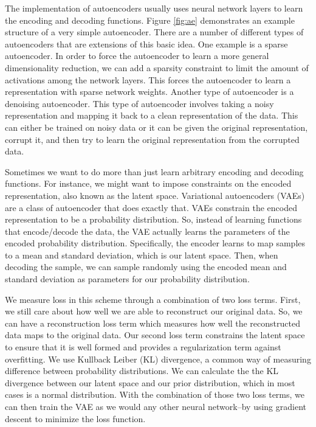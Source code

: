 The implementation of autoencoders usually uses neural network layers to learn the encoding and decoding functions.
Figure \ref{fig:ae} demonstrates an example structure of a very simple autoencoder.
There are a number of different types of autoencoders that are extensions of this basic idea.
One example is a sparse autoencoder.
In order to force the autoencoder to learn a more general dimensionality reduction, we can add a sparsity constraint to limit the amount of activations among the network layers.
This forces the autoencoder to learn a representation with sparse network weights.
Another type of autoencoder is a denoising autoencoder.
This type of autoencoder involves taking a noisy representation and mapping it back to a clean representation of the data.
This can either be trained on noisy data or it can be given the original representation, corrupt it, and then try to learn the original representation from the corrupted data.

Sometimes we want to do more than just learn arbitrary encoding and decoding functions.
For instance, we might want to impose constraints on the encoded representation, also known as the latent space.
Variational autoencoders (VAEs) are a class of autoencoder that does exactly that.
VAEs constrain the encoded representation to be a probability distribution.
So, instead of learning functions that encode/decode the data, the VAE actually learns the parameters of the encoded probability distribution.
Specifically, the encoder learns to map samples to a mean and standard deviation, which is our latent space.
Then, when decoding the sample, we can sample randomly using the encoded mean and standard deviation as parameters for our probability distribution.

We measure loss in this scheme through a combination of two loss terms.
First, we still care about how well we are able to reconstruct our original data.
So, we can have a reconstruction loss term which measures how well the reconstructed data maps to the original data.
Our second loss term constrains the latent space to ensure that it is well formed and provides a regularization term against overfitting.
We use Kullback Leiber (KL) divergence, a common way of measuring difference between probability distributions.
We can calculate the the KL divergence between our latent space and our prior distribution, which in most cases is a normal distribution.
With the combination of those two loss terms, we can then train the VAE as we would any other neural network--by using gradient descent to minimize the loss function.
